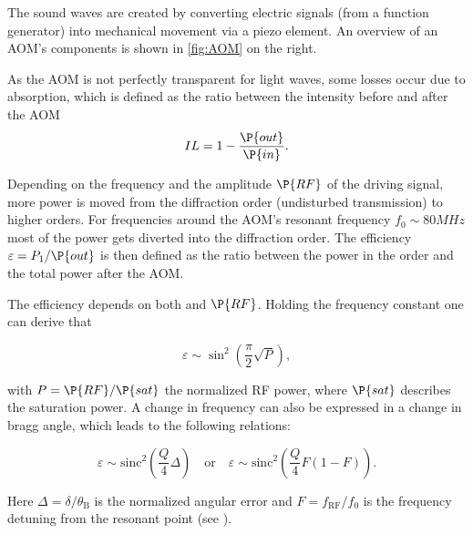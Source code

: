 The sound waves are created by converting electric signals (from a function generator) into mechanical movement via a piezo element. An overview of an AOM's components is shown in \autoref{fig:AOM} on the right. 

As the AOM is not perfectly transparent for light waves, some losses occur due to absorption, which is defined as the ratio between the intensity before and after the AOM 
\[ IL = 1 - \frac{\P{out}}{\P{in}}. \]

Depending on the frequency \frf and the amplitude \( \P{RF} \) of the driving signal, more power is moved from the  diffraction order (undisturbed transmission) to higher orders. For frequencies around the AOM's resonant frequency \(f_0 \sim 80 \unit{MHz} \) \autocite{AOM} most of the power gets diverted into the  diffraction order. The efficiency \( \varepsilon = P_1/\P{out} \) is then defined as the ratio between the power in the  order and the total power after the AOM. 

The efficiency depends on both \frf and \( \P{RF} \). Holding the frequency \frf constant one can derive that 

\begin{equation}\label{eqn:epsilon2}
	\varepsilon \sim \sin^2\left(\frac{\pi}{2} \sqrt{P}\right),
\end{equation}

with \( P = \P{RF}/\P{sat} \) the normalized RF power, where $\P{sat}$ describes the saturation power. A change in frequency can also be expressed in a change in bragg angle, which leads to the following relations:

\begin{equation}\label{eqn:epsilon}
	\varepsilon \sim \mathrm{sinc}^2\left(\frac{Q}{4}\Delta\right) 
	\quad\text{or}\quad 
	\varepsilon \sim \mathrm{sinc}^2\left(\frac{Q}{4} F \left(1-F\right)\right).
\end{equation}

Here \( \Delta = \delta/\theta_\mathrm{B} \) is the normalized angular error and \( F = f_\mathrm{RF}/f_0 \) is the frequency detuning from the resonant point (see \autocite{skript}). 

